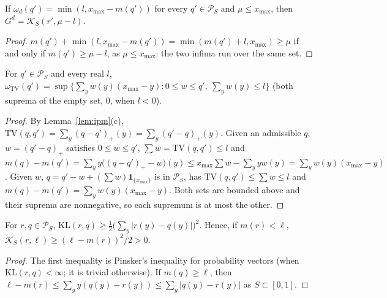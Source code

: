 \documentclass[11pt]{article}
\newcommand{\xmax}{x_{\max}}
\newcommand{\Simp}{\mathcal{P}_{S}}
\newcommand{\mean}{m}
\newcommand{\KL}{\mathrm{KL}}
\newcommand{\TV}{\mathrm{TV}}
\newcommand{\Ks}{\mathcal{K}_{S}}
\newcommand{\dirac}{\mathbf{1}_{\{x_{\max}\}}}
\newcommand{\om}{\omega}
\newcommand{\Gd}{G}
\begin{document}
\begin{lemma}\label{flem:threshold-ks}
If $\om_d(q')=\min(l,\xmax-\mean(q'))$ for every $q'\in\Simp$ and $\mu\le\xmax$, then
$\Gd^d=\Ks(r',\mu-l)$.
\end{lemma}

\begin{proof}
$\mean(q')+\min(l,\xmax-\mean(q'))=\min(\mean(q')+l,\xmax)\ge\mu$ if and only if
$\mean(q')\ge\mu-l$, as $\mu\le\xmax$: the two infima run over the same set.
\end{proof}

\begin{lemma}\label{flem:reach-tv}
For $q'\in\Simp$ and every real $l$, $\om_{\TV}(q')=\sup\{\sum_yw(y)(\xmax-y):0\le w\le q',\
\sum_yw(y)\le l\}$ (both suprema of the empty set, $0$, when $l<0$).
\end{lemma}

\begin{proof}
By Lemma~\ref{lem:ipm}(c), $\TV(q,q')=\sum_y(q-q')_+(y)=\sum_y(q'-q)_+(y)$. Given an admissible $q$,
$w=(q'-q)_+$ satisfies $0\le w\le q'$, $\sum w=\TV(q,q')\le l$ and
$\mean(q)-\mean(q')=\sum_yy\big((q-q')_+-w\big)(y)\le\xmax\sum w-\sum_yyw(y)=\sum_yw(y)(\xmax-y)$.
Given $w$, $q=q'-w+(\sum w)\dirac$ is in $\Simp$, has $\TV(q,q')\le\sum w\le l$ and
$\mean(q)-\mean(q')=\sum_yw(y)(\xmax-y)$. Both sets are bounded above and their suprema are
nonnegative, so each supremum is at most the other.
\end{proof}

\begin{lemma}[$\Ks>0$ below the level]\label{flem:ks-pos}
\uses{def:laws}
For $r,q\in\Simp$, $\KL(r,q)\ge\frac12\big(\sum_y|r(y)-q(y)|\big)^2$. Hence, if $\mean(r)<\ell$,
$\Ks(r,\ell)\ge(\ell-\mean(r))^2/2>0$.
\end{lemma}

\begin{proof}
The first inequality is Pinsker's inequality for probability vectors (when $\KL(r,q)<\infty$; it is
trivial otherwise). If $\mean(q)\ge\ell$, then
$\ell-\mean(r)\le\sum_yy(q(y)-r(y))\le\sum_y|q(y)-r(y)|$ as $S\subset[0,1]$.
\end{proof}
\end{document}
